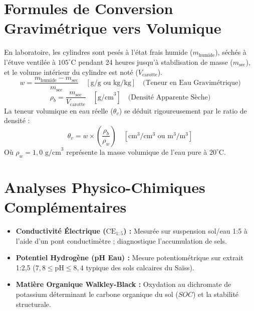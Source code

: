 \documentclass[11pt,a4paper,oneside]{report}
\begin{document}
\section{Formules de Conversion Gravimétrique vers Volumique}
En laboratoire, les cylindres sont pesés à l'état frais humide ($m_{\text{humide}}$), séchés à l'étuve ventilée à $105^\circ\text{C}$ pendant 24 heures jusqu'à stabilisation de masse ($m_{\text{sec}}$), et le volume intérieur du cylindre est noté ($V_{\text{carotte}}$).
\begin{equation}
w = \frac{m_{\text{humide}} - m_{\text{sec}}}{m_{\text{sec}}} \quad [\text{g/g ou kg/kg}] \quad \text{(Teneur en Eau Gravimétrique)}
\end{equation}
\begin{equation}
\rho_b = \frac{m_{\text{sec}}}{V_{\text{carotte}}} \quad [\text{g/cm}^3] \quad \text{(Densité Apparente Sèche)}
\end{equation}
La teneur volumique en eau réelle ($\theta_v$) se déduit rigoureusement par le ratio de densité :
\begin{equation}
\theta_v = w \times \left( \frac{\rho_b}{\rho_w} \right) \quad [\text{cm}^3/\text{cm}^3 \text{ ou } \text{m}^3/\text{m}^3]
\end{equation}
Où $\rho_w = 1,0\text{ g/cm}^3$ représente la masse volumique de l'eau pure à $20^\circ\text{C}$.

\section{Analyses Physico-Chimiques Complémentaires}
\begin{itemize}[leftmargin=*]
    \item \textbf{Conductivité Électrique ($\text{CE}_{1:5}$) :} Mesurée sur suspension sol/eau 1:5 à l'aide d'un pont conductimètre ; diagnostique l'accumulation de sels.
    \item \textbf{Potentiel Hydrogène (pH Eau) :} Mesure potentiométrique sur extrait 1:2,5 ($7,8 \le \text{pH} \le 8,4$ typique des sols calcaires du Saïss).
    \item \textbf{Matière Organique Walkley-Black :} Oxydation au dichromate de potassium déterminant le carbone organique du sol ($SOC$) et la stabilité structurale.
\end{itemize}

\end{document}
